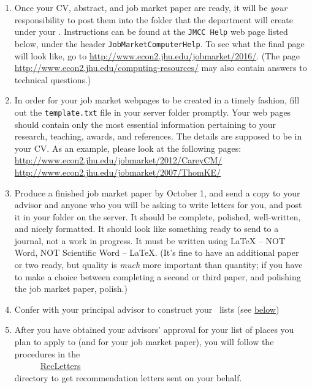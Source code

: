 \documentclass{\classes/econtex}
\begin{document}
\begin{enumerate}
  \hypertarget{Post-To-Server}{}
\item Once your CV, abstract, and job market paper are ready, it will
  be \textit{your} responsibility to post them into the folder that
  the department will create under your \Moniker.
  Instructions can be found at the \texttt{JMCC Help} web page listed
  below, under the header \texttt{JobMarketComputerHelp}.  To see what
  the final page will look like, go to
  \url{http://www.econ2.jhu.edu/jobmarket/2016/}.  (The page
  \url{http://www.econ2.jhu.edu/computing-resources/}
  may also contain answers to technical questions.)
  
  \hypertarget{Template}{}
\item In order for your job market webpages to be created in a timely fashion, 
  fill out the \texttt{template.txt} file in your server folder promptly.
  Your web pages should contain only the most essential information 
  pertaining to your research, teaching, awards, and references. 
  The details are supposed to be in your CV.
  As an example, please look at the following pages:\\
  {\small \url{http://www.econ2.jhu.edu/jobmarket/2012/CareyCM/}}\\
  {\small \url{http://www.econ2.jhu.edu/jobmarket/2007/ThomKE/}}
  

  \hypertarget{Produce-Job-Paper}{}
\item Produce a finished job market paper by October 1, and send a copy to your advisor and anyone who you will be asking to write letters for you, and post it in your folder on the server.  It should be complete, polished, well-written, and nicely formatted.  It should look like something ready to send to a journal, not a work in progress.  It must be written using {\LaTeX} -- NOT Word, NOT Scientific Word -- {\LaTeX}.  (It's fine to have an additional paper or two ready, but quality is \textit{much} more important than quantity; if you have to make a choice between completing a second or third paper, and polishing the job market paper, polish.)
  
  \hypertarget{\EM}{}
\item Confer with your principal advisor to construct your~{\EMtt} lists (see \hyperlink{below}{below})

  
  \hypertarget{Rec-Letters}{}
\item After you have obtained your advisors' approval for your list of
  places you plan to apply to (and for your job market paper), you
  will follow the procedures in the \\
  ~~~~~~\href{\bloburl/RecLetters}{RecLetters} \\
  directory to get recommendation letters sent on your behalf.


\end{enumerate}
\end{document}
